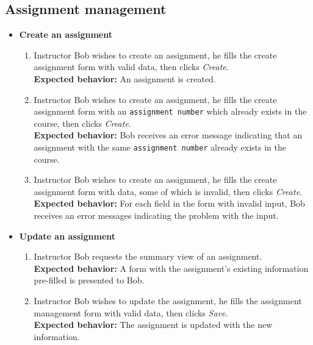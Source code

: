 \subsection{Assignment management}
\begin{itemize}
    \item \textbf{Create an assignment} \begin{enumerate}
        \item Instructor Bob wishes to create an assignment, he fills the
            create assignment form with valid data, then clicks \emph{Create}. \\
        {\bf Expected behavior:} An assignment is created.

        \item Instructor Bob wishes to create an assignment, he fills the
            create assignment form with an \texttt{assignment number}
            which already exists in the course, then clicks \emph{Create}. \\
        {\bf Expected behavior:} Bob receives an error message indicating
            that an assignment with the same \texttt{assignment number}
            already exists in the course.

        \item Instructor Bob wishes to create an assignment, he fills the
            create assignment form with data, some of which is invalid,
            then clicks \emph{Create}. \\
        {\bf Expected behavior:} For each field in the form with invalid input,
            Bob receives an error messages indicating the problem with the
            input.
    \end{enumerate}

    \item \textbf{Update an assignment} \begin{enumerate}
        \item Instructor Bob requests the summary view of an assignment. \\
        {\bf Expected behavior:} A form with the assignment's existing
            information pre-filled is presented to Bob.

        \item Instructor Bob wishes to update the assignment, he fills the
            assignment management form with valid data, then clicks \emph{Save}. \\
        {\bf Expected behavior:} The assignment is updated with the new
            information.


\end{enumerate}
\end{itemize}
